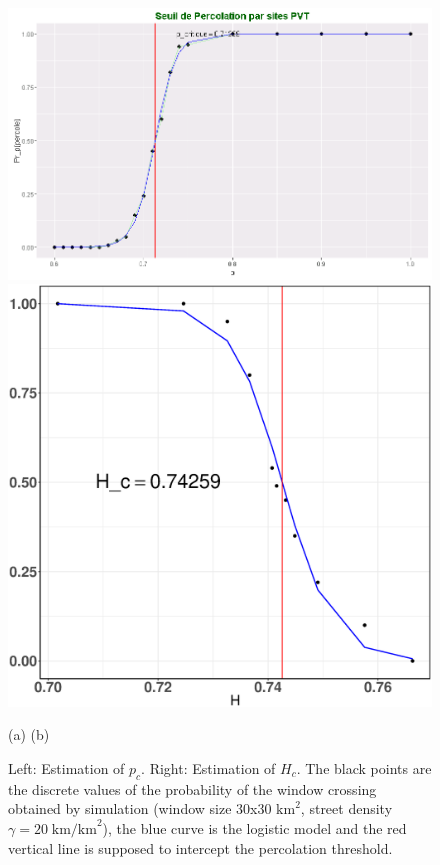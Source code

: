 \documentclass[conference]{IEEEtran}
\begin{document}
\begin{figure}[t!]
\centerline{
\includegraphics[width=0.48\linewidth]{Figures/Site-threshold-PVT}
\hspace{0.01\linewidth}
\includegraphics[width=0.48\linewidth]{Figures/sites-H_c-p=1}}
\centerline{\footnotesize\hspace{0.25\linewidth} (a)\hspace{0.5\linewidth} (b) \hspace{0.25\linewidth}\ }
\caption{Left: Estimation of $p_c$. Right: Estimation of $H_c$.
The black points are the discrete values of the probability of the window
crossing obtained by simulation (window size 30x30 $\text{km}^{2}$, street density $\gamma = 20 \; \text{km/km}^{2}$), the blue curve is the logistic model and the red vertical line is supposed to intercept the percolation threshold.}
\label{p-H-thresholds}
\end{figure}
\end{document}
